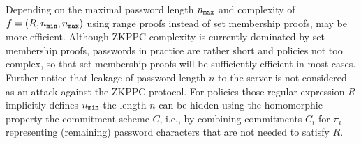 \begin{remark}\label{rangeproofs}
Depending on the maximal password length ${n_\mathtt{max}}$ and complexity of $f=(R,{n_\mathtt{min}},{n_\mathtt{max}})$ using range proofs instead of set membership proofs, may be more efficient.
Although \ac{ZKPPC} complexity is currently dominated by set membership proofs, passwords in practice are rather short and policies not too complex, so that set membership proofs will be sufficiently efficient in most cases.
Further notice that leakage of password length $n$ to the server is not considered as an attack against the \ac{ZKPPC} protocol. 
For policies those regular expression $R$ implicitly defines ${n_\mathtt{min}}$ the length $n$ can be hidden using the homomorphic property the commitment scheme $C$, i.e., by combining commitments $C_i$ for $\pi_i$ representing (remaining) password characters that are not needed to satisfy $R$.
\end{remark}

